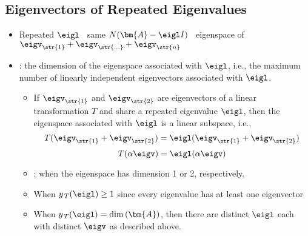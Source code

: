 \begin{itemize}
  \subsection{Eigenvectors of Repeated Eigenvalues}\label{Eigenvectors of Repeated Eigenvalues}
  \begin{itemize}
    \item Repeated \(\eigl\) \to~same \(N(\bm{A}-\eigl I)\) \to~eigenspace of \(\eigv_\str{1} + \eigv_\str{\ldots} + \eigv_\str{n} \)
    \item {}: the dimension of the eigenspace associated with \(\eigl\), i.e., the maximum number of linearly independent eigenvectors associated with \(\eigl\).
    \begin{itemize}
      \item If \(\eigv_\str{1}\) and \(\eigv_\str{2}\) are eigenvectors of a linear transformation \(T\) and share a repeated eigenvalue \(\eigl\), then the eigenspace associated with \(\eigl\) is a linear subspace, i.e.,
      \[%
      T(\eigv_\str{1} + \eigv_\str{2}) = \eigl(\eigv_\str{1} + \eigv_\str{2})
      \]%
      \[%
      T(\alpha \eigv) = \eigl(\alpha \eigv)
      \]%
      \item {}: when the eigenspace has dimension 1 or 2, respectively.
      \item When \(y_{\, T}(\eigl) \geq 1 \) since every eigenvalue has at least one eigenvector
      \item When \(y_{\, T}(\eigl)= \dim{(\bm{A})}\), then there are distinct \(\eigl\) each with distinct \(\eigv\) as described above.
    \end{itemize}
  \end{itemize}


\end{itemize}
